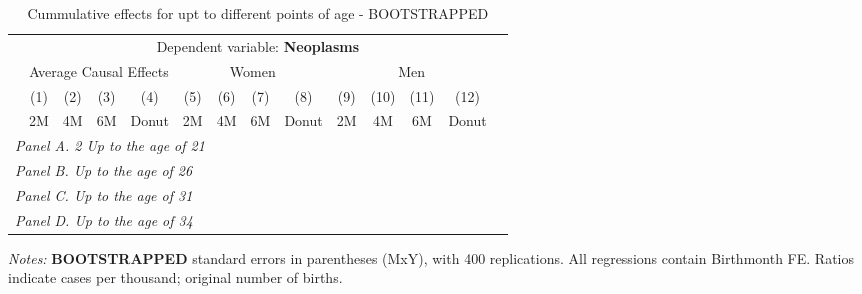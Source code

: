  \begin{table}[H] \begin{threeparttable} \centering \caption{Cummulative effects for upt to different points of age - BOOTSTRAPPED} {\def\sym#1{\ifmmode^{#1}\else\(^{#1}\)\fi} \begin{tabular}{l*{13}{c}} \toprule & \multicolumn{12}{c}{Dependent variable: \textbf{Neoplasms}} \\ \cmidrule(lr){2-13}
            &\multicolumn{4}{c}{Average Causal Effects}         &\multicolumn{4}{c}{Women}                          &\multicolumn{4}{c}{Men}                            \\\cmidrule(lr){2-5}\cmidrule(lr){6-9}\cmidrule(lr){10-13}
            &\multicolumn{1}{c}{(1)}&\multicolumn{1}{c}{(2)}&\multicolumn{1}{c}{(3)}&\multicolumn{1}{c}{(4)}&\multicolumn{1}{c}{(5)}&\multicolumn{1}{c}{(6)}&\multicolumn{1}{c}{(7)}&\multicolumn{1}{c}{(8)}&\multicolumn{1}{c}{(9)}&\multicolumn{1}{c}{(10)}&\multicolumn{1}{c}{(11)}&\multicolumn{1}{c}{(12)}\\
            &\multicolumn{1}{c}{2M}&\multicolumn{1}{c}{4M}&\multicolumn{1}{c}{6M}&\multicolumn{1}{c}{Donut}&\multicolumn{1}{c}{2M}&\multicolumn{1}{c}{4M}&\multicolumn{1}{c}{6M}&\multicolumn{1}{c}{Donut}&\multicolumn{1}{c}{2M}&\multicolumn{1}{c}{4M}&\multicolumn{1}{c}{6M}&\multicolumn{1}{c}{Donut}\\
\midrule
 \multicolumn{13}{l}{\emph{Panel A. 2 Up to the age of 21}} \\   \midrule\multicolumn{13}{l}{\emph{Panel B. Up to the age of 26}} \\   \midrule\multicolumn{13}{l}{\emph{Panel C. Up to the age of 31}} \\   \midrule\multicolumn{13}{l}{\emph{Panel D. Up to the age of 34}} \\   
\bottomrule \end{tabular} } \begin{tablenotes} \item \scriptsize \emph{Notes:} \textbf{BOOTSTRAPPED} standard errors in parentheses (MxY), with 400 replications. All regressions contain Birthmonth FE. Ratios indicate cases per thousand; original number of births. \end{tablenotes} \end{threeparttable} \end{table} 
